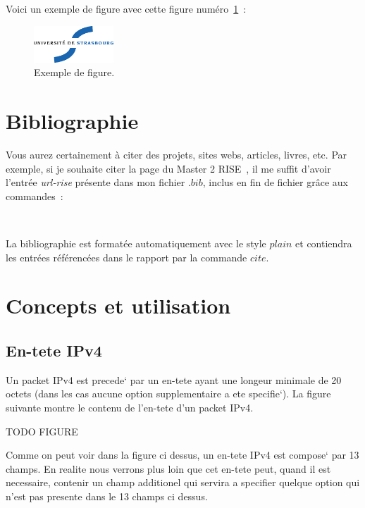 \documentclass[twoside,openright,a4paper,11pt,french]{article}
\begin{document}
Voici un exemple de figure avec cette figure numéro~\ref{fig:uds}~:

\begin{figure}[ht]
\centering
  \includegraphics[width=3cm,angle=45]{pics/uds.eps}
  \caption{Exemple de figure.}
  \label{fig:uds}
\end{figure}

\section{Bibliographie}

Vous aurez certainement à citer des projets, sites webs, articles, livres, etc.
Par exemple, si je souhaite citer la page du Master 2 RISE~\cite{url-rise}, il me suffit d'avoir l'entrée {\it url-rise} présente dans mon fichier $.bib$, inclus en fin de fichier  grâce aux commandes~:
\begin{verbatim}


\end{verbatim} 

La bibliographie est formatée automatiquement avec le style $plain$ et contiendra les entrées référencées dans le rapport par la commande $cite$.



\section{Concepts et utilisation}

\subsection{En-tete IPv4}
Un packet IPv4 est precede` par un en-tete ayant une longeur minimale de 20 octets 
(dans les cas aucune option supplementaire a ete specifie`).
La figure suivante montre le contenu de l'en-tete d'un packet IPv4.


TODO FIGURE


Comme on peut voir dans la figure ci dessus, un en-tete IPv4 est compose` par
13 champs. En realite nous verrons plus loin que cet en-tete peut, quand il est
necessaire, contenir un champ additionel qui servira a specifier quelque
option qui n'est pas presente dans le 13 champs ci dessus.
\end{document}
